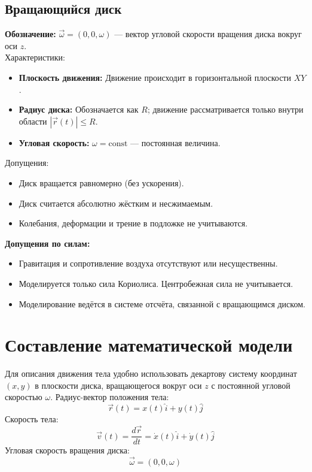 \documentclass[a4paper,12pt]{article}
\begin{document}
\subsection{Вращающийся диск}

\textbf{Обозначение:} $\vec{\omega} = (0, 0, \omega)$ — вектор угловой скорости вращения диска вокруг оси $z$. \\
Характеристики:
\begin{itemize}
    \item \textbf{Плоскость движения:} Движение происходит в горизонтальной плоскости $XY$.
    \item \textbf{Радиус диска:} Обозначается как $R$; движение рассматривается только внутри области $|\vec{r}(t)| \leq R$.
    \item \textbf{Угловая скорость:} $\omega = \text{const}$ — постоянная величина.
\end{itemize}
Допущения:
\begin{itemize}
    \item Диск вращается равномерно (без ускорения).
    \item Диск считается абсолютно жёстким и несжимаемым.
    \item Колебания, деформации и трение в подложке не учитываются.
\end{itemize}

\textbf{Допущения по силам:}
\begin{itemize}
    \item Гравитация и сопротивление воздуха отсутствуют или несущественны.
    \item Моделируется только сила Кориолиса. Центробежная сила не учитывается.
    \item Моделирование ведётся в системе отсчёта, связанной с вращающимся диском.
\end{itemize}

\newpage

\section{Составление математической модели}

Для описания движения тела удобно использовать декартову систему координат $(x, y)$ в плоскости диска, вращающегося вокруг оси $z$ с постоянной угловой скоростью $\omega$. Радиус-вектор положения тела:
\[
\vec{r}(t) = x(t)\hat{i} + y(t)\hat{j}
\]
Скорость тела:
\[
\vec{v}(t) = \frac{d\vec{r}}{dt} = \dot{x}(t)\hat{i} + \dot{y}(t)\hat{j}
\]
Угловая скорость вращения диска:
\[
\vec{\omega} = (0, 0, \omega)
\]
\end{document}
